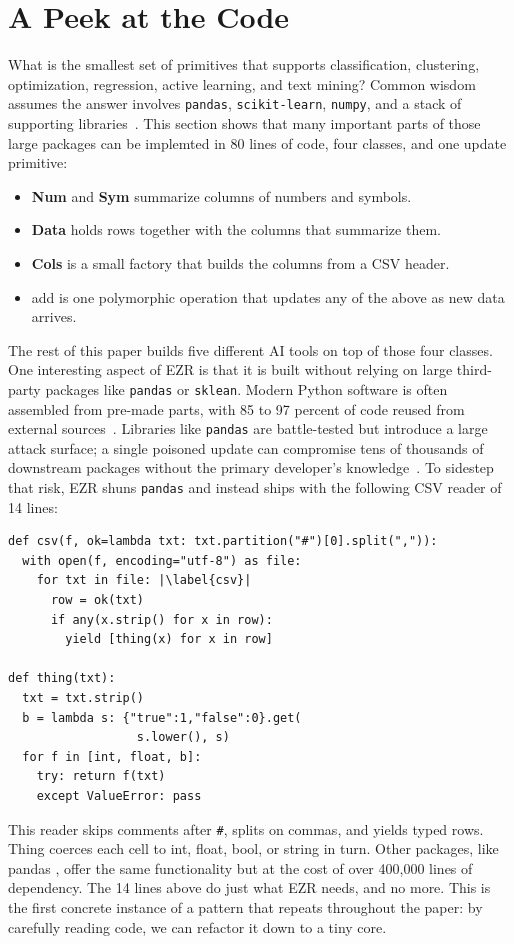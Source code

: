\documentclass[AMA,STIX2COL]{WileyNJDv5}
\newcommand{\IT}{{\sffamily EZR}}
\newcommand{\cls}[1]{%
  \setlength{\fboxsep}{1.5pt}%
  \colorbox{clsbg}{\sffamily\bfseries{#1}}%
}
\begin{document}
{\section{A Peek at the Code}\label{sec:peek}

What is the smallest set of primitives that supports
classification, clustering, optimization, regression, active
learning, and text mining? Common wisdom assumes the answer
involves \texttt{pandas}, \texttt{scikit-learn}, \texttt{numpy},
and a stack of supporting libraries~\cite{martinez2021}. This
section shows that many important parts
of those large packages can be implemted in 
80 lines of code, four classes, and one update
primitive:
\begin{itemize}
\item \cls{Num} and \cls{Sym} summarize columns of numbers and
symbols.
\item \cls{Data} holds rows together with the columns that
summarize them.
\item \cls{Cols} is a small factory that builds the columns
from a CSV header.
\item \textsf{add} is one polymorphic operation that updates any
of the above as new data arrives.
\end{itemize}
The rest of this paper builds five different AI tools on top of
those four classes. One interesting
aspect of EZR is that it is built without relying on
large third-party packages like
 \texttt{pandas} or  \texttt{sklean}.   Modern Python software
is often assembled from pre-made parts, with 85 to 97 percent
of code reused from external sources~\cite{martinez2021}.
Libraries like \texttt{pandas} are battle-tested but introduce
a large attack surface; a single poisoned update can compromise
tens of thousands of downstream packages without the primary
developer's knowledge~\cite{martinez2021}. To sidestep that
risk, \IT{} shuns \texttt{pandas} and instead ships with the
following CSV reader of 14 lines:\newpage
\begin{verbatim}
def csv(f, ok=lambda txt: txt.partition("#")[0].split(",")):
  with open(f, encoding="utf-8") as file:
    for txt in file: |\label{csv}|
      row = ok(txt)
      if any(x.strip() for x in row):
        yield [thing(x) for x in row]

def thing(txt):
  txt = txt.strip()
  b = lambda s: {"true":1,"false":0}.get(
                  s.lower(), s)
  for f in [int, float, b]:
    try: return f(txt)
    except ValueError: pass
\end{verbatim}
This reader skips comments after \texttt{\#}, splits on commas,
and yields typed rows. \textsf{Thing} coerces each cell to int,
float, bool, or string in turn. 
Other packages, like \textsf{pandas} , offer the same functionality
 but at the cost
of over 400,000 lines of dependency. The 14 lines
above do just what \IT{} needs, and no more. This is the first
concrete instance of a pattern that repeats throughout the paper:
by carefully reading code, we can refactor it down to a tiny core.

}
\end{document}
